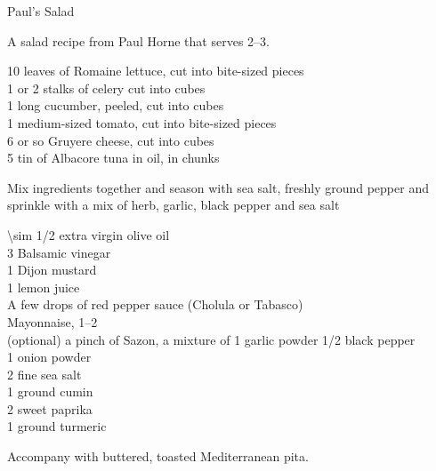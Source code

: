 
\begin{entry}{Paul's Salad}

\begin{open}
    A salad recipe from Paul Horne that serves \numrange{2}{3}.
\end{open}
\begin{ingredients}
    10 leaves of Romaine lettuce, cut into bite-sized pieces\\
    1 or 2 stalks of celery cut into cubes\\
    1 long cucumber, peeled, cut into cubes\\
    1 medium-sized tomato, cut into bite-sized pieces\\
    \SI{6}{\ounce} or so Gruyere cheese, cut into cubes\\
    \SI{5}{\ounce} tin of Albacore tuna in oil, in chunks
\end{ingredients}
Mix ingredients together and season with sea salt, freshly ground pepper and
sprinkle with a mix of herb, garlic, black pepper and sea salt


\begin{ingredients}
    \SI{\sim 1/2}{\cup} extra virgin olive oil\\
    \SI{3}{\tblspoon} Balsamic vinegar\\
    \SI{1}{\tblspoon} Dijon mustard\\
    \SI{1}{\tblspoon} lemon juice\\
    A few drops of red pepper sauce (Cholula or Tabasco)\\
    Mayonnaise, \SIrange[range-phrase={ or }]{1}{2}{\tblspoon}\\
    (optional) a pinch of Sazon, a mixture of \SI{1}{\tblspoon} garlic powder
    \SI{1/2}{\teaspoon} black pepper\\
    \SI{1}{\tblspoon} onion powder\\
    \SI{2}{\tblspoon} fine sea salt\\
    \SI{1}{\tblspoon} ground cumin\\
    \SI{2}{\tblspoon} sweet paprika\\
    \SI{1}{\tblspoon} ground turmeric
\end{ingredients}
Accompany with buttered, toasted Mediterranean pita.
\end{entry}

